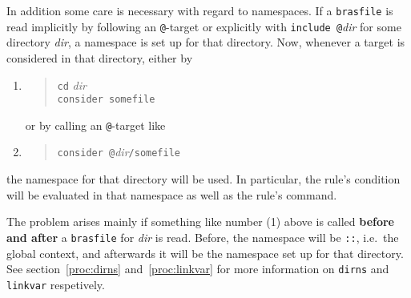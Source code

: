 \documentclass[11pt,bibtotoc,idxtotoc]{scrreprt}
\makeatletter
\newcommand{\brasfile}{\texttt{brasfile}}
\newcommand{\indextt}[1]{\index{#1@\texttt{#1}}}
\makeatother
\begin{document}
In addition some care is necessary with regard to
namespaces. If a \brasfile{} is read implicitly by
following an \texttt{@}-target  or explicitly with
\texttt{include @}\textit{dir}\indextt{include} for some directory
\textit{dir}, a namespace is set up for that directory. Now, whenever
a target is considered in that directory, either by
\begin{enumerate}
\item
  \begin{quote}
    \texttt{cd} \textit{dir}\\
    \texttt{consider somefile}
  \end{quote}
or by calling an \texttt{@}-target like 
\item 
  \begin{quote}
    \texttt{consider @}\textit{dir}\texttt{/somefile}
  \end{quote}
\end{enumerate}
the namespace for that directory will be used. In particular, the
rule's condition will be evaluated in that namespace as well as the
rule's command.

The problem arises mainly if something like number (1) above is called
\textbf{before and after} a \brasfile{} for \textit{dir} is
read. Before, the namespace will be \texttt{::}, i.e.\ the global
context, and afterwards it will be the namespace set up for that
directory. See section~\ref{proc:dirns} and~\ref{proc:linkvar} for
more information on \texttt{dirns} and \texttt{linkvar} respetively.

\end{document}
